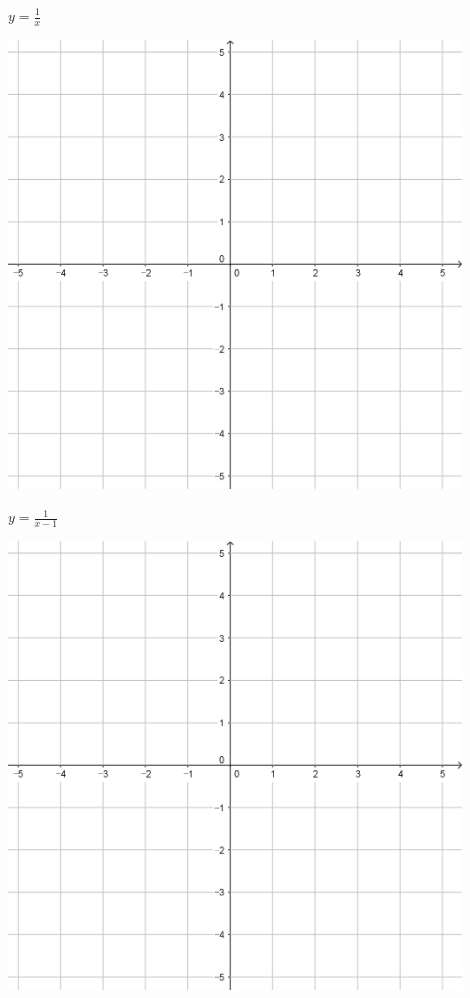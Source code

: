 \documentclass[a4paper]{oblivoir}
\begin{document}
\clearpage
\begin{minipage}{0.45\textwidth}\centering
\(y=\frac1x\)
\par\bigskip\includegraphics[width=0.9\textwidth]{55}
\end{minipage}
\begin{minipage}{0.45\textwidth}\centering
\(y=\frac1{x-1}\)
\par\bigskip\includegraphics[width=0.9\textwidth]{55}
\end{minipage}\bigskip\bigskip\par
\end{document}
